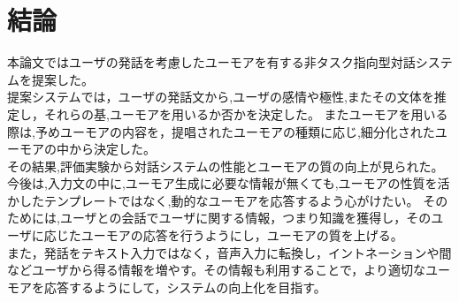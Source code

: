 \chapter{結論}


本論文ではユーザの発話を考慮したユーモアを有する非タスク指向型対話システムを提案した。\\
\hspace{1zw}提案システムでは，ユーザの発話文から,ユーザの感情や極性,またその文体を推定し，それらの基,ユーモアを用いるか否かを決定した。
またユーモアを用いる際は,予めユーモアの内容を，提唱されたユーモアの種類に応じ,細分化されたユーモアの中から決定した。\\
\hspace{1zw}その結果,評価実験から対話システムの性能とユーモアの質の向上が見られた。\\
\hspace{1zw}今後は,入力文の中に,ユーモア生成に必要な情報が無くても,ユーモアの性質を活かしたテンプレートではなく,動的なユーモアを応答するよう心がけたい。
そのためには,ユーザとの会話でユーザに関する情報，つまり知識を獲得し，そのユーザに応じたユーモアの応答を行うようにし，ユーモアの質を上げる。\\
\hspace{1zw}また，発話をテキスト入力ではなく，音声入力に転換し，イントネーションや間などユーザから得る情報を増やす。その情報も利用することで，より適切なユーモアを応答するようにして，システムの向上化を目指す。